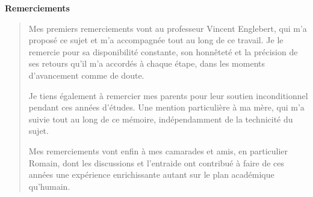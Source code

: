 \noindent\textbf{\huge Remerciements}

\bigskip

\begin{quote}
Mes premiers remerciements vont au professeur Vincent Englebert, qui m'a proposé ce sujet et m'a accompagnée tout au long de ce travail. Je le remercie pour sa disponibilité constante, son honnêteté et la précision de ses retours qu’il m’a accordés à chaque étape, dans les moments d'avancement comme de doute.

Je tiens également à remercier mes parents pour leur soutien inconditionnel pendant ces années d'études. Une mention particulière à ma mère, qui m'a suivie tout au long de ce mémoire, indépendamment de la technicité du sujet.

Mes remerciements vont enfin à mes camarades et amis, en particulier Romain, dont les discussions et l’entraide ont contribué à faire de ces années une expérience enrichissante autant sur le plan académique qu’humain.
\end{quote}
